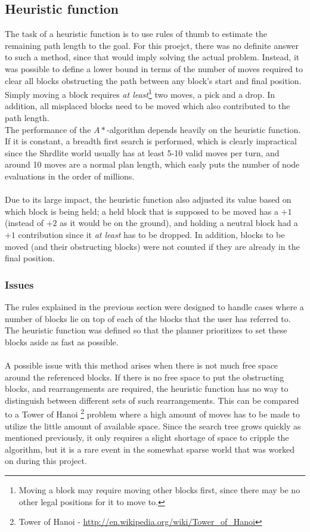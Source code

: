 \subsection{Heuristic function}
The task of a heuristic function is to use rules of thumb to estimate the
remaining path length to the goal. For this proejct, there was no definite
answer to such a method, since that would imply solving the actual problem.
Instead, it was possible to define a lower bound in terms of the number of moves
required to clear all blocks obstructing the path between any block's start and
final position. Simply moving a block requires \textit{at least}\footnote{Moving
a block may require moving other blocks first, since there may be no other legal
positions for it to move to.} two moves, a pick and a drop. In addition, all
misplaced blocks need to be moved which also contributed to the path length.  
\\
The performance of the $A*$-algorithm depends heavily on the heuristic function.
If it is constant, a breadth first search is performed, which is clearly
impractical since the Shrdlite world usually has at least 5-10 valid moves per
turn, and around 10 moves are a normal plan length, which easly puts the number
of node evaluations in the order of millions. 
\\\\
Due to its large impact, the heuristic function also adjusted its value based on
which block is being held; a held block that is supposed to be moved has a $+1$
(instead of $+2$ as it would be on the ground), and holding a neutral block had
a $+1$ contribution since it \textit{at least} has to be dropped. In addition,
blocks to be moved (and their obstructing blocks) were not counted if they are
already in the final position.

\subsubsection{Issues}
The rules explained in the previous section were designed to handle cases where
a number of blocks lie on top of each of the blocks that the user has referred
to. The heuristic function was defined so that the planner prioritizes to set
these blocks aside as fast as possible.
\\\\
A possible issue with this method arises when there is not much free space
around the referenced blocks. If there is no free space to put the obstructing
blocks, and rearrangements are required, the heuristic function has no way to
distinguish between different sets of such rearrangements. This can be compared
to a Tower of Hanoi \footnote{Tower of Hanoi -
\url{http://en.wikipedia.org/wiki/Tower_of_Hanoi}} problem where a high amount of
moves has to be made to utilize the little amount of available space. Since the
search tree grows quickly as mentioned previously, it only requires a slight
shortage of space to cripple the algorithm, but it is a rare event in the
somewhat sparse world that was worked on during this project.

